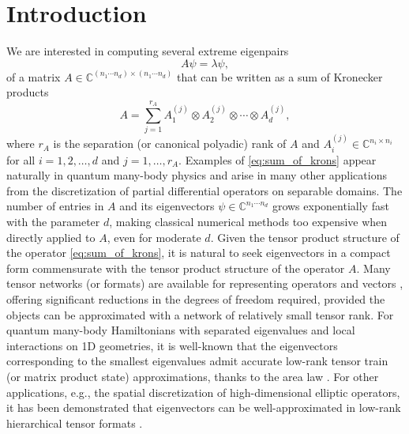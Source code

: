 \documentclass[10pt,preprint]{elsarticle}
\begin{document}
\section{Introduction}
\label{sec:Intro}

We are interested in computing several extreme eigenpairs 
\begin{equation} \label{eq:eigen}
A \psi = \lambda \psi, 
\end{equation}
of a matrix $A \in \mathbb{C}^{(n_1 \cdots n_d) \times (n_1 \cdots n_d)}$ that can be written as a sum of Kronecker products 
\begin{equation} \label{eq:sum_of_krons}
    A = \sum_{j = 1}^{r_A} A_1^{(j)} \otimes A_2^{(j)} \otimes \cdots \otimes A_d^{(j)}, 
\end{equation} 
where $r_A$ is the separation (or canonical polyadic) rank of $A$ and $A_{i}^{(j)} \in \mathbb{C}^{n_i \times n_i}$ for all $i = 1,2,\ldots,d$ and $j = 1,\ldots,r_A$. Examples of \eqref{eq:sum_of_krons} appear naturally in quantum many-body physics and arise in many other applications from the discretization of partial differential operators on separable domains. The number of entries in $A$ and its eigenvectors $\psi \in \mathbb{C}^{n_1 \cdots n_d}$ grows exponentially fast with the parameter $d$, making classical numerical methods too expensive when directly applied to $A$, even for moderate $d$. Given the tensor product structure of the operator \eqref{eq:sum_of_krons}, it is natural to seek eigenvectors in a compact form commensurate with the tensor product structure of the operator $A$. Many tensor networks (or formats) are available for representing operators and vectors \cite{Grasedyck2013}, offering significant reductions in the degrees of freedom required, provided the objects can be approximated with a network of relatively small tensor rank. For quantum many-body Hamiltonians with separated eigenvalues and local interactions on 1D geometries, it is well-known that the eigenvectors corresponding to the smallest eigenvalues admit accurate low-rank tensor train (or matrix product state) approximations, thanks to the area law \cite{Hastings2007}. For other applications, e.g., the spatial discretization of high-dimensional elliptic operators, it has been demonstrated that eigenvectors can be well-approximated in low-rank hierarchical tensor formats \cite{ballani2013projection,hackbusch2012}. 
\end{document}
